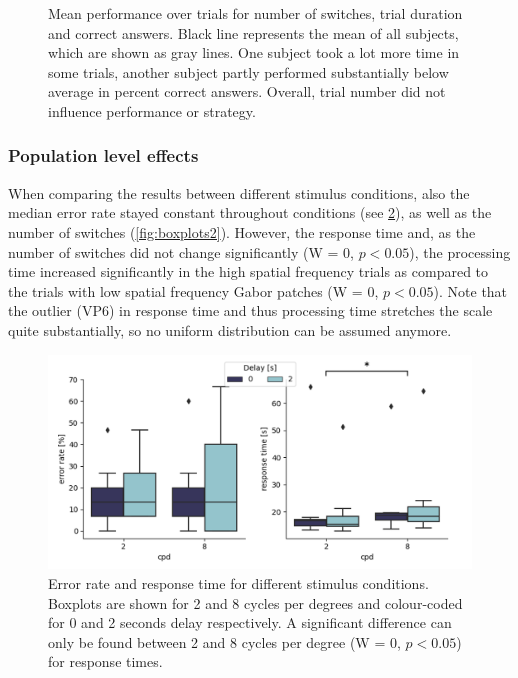 \begin{figure}[H]
    \centering
    
    \caption[Mean performance over trials]{Mean performance over trials for number of switches, trial duration and correct answers. Black line represents the mean of all subjects, which are shown as gray lines. One subject took a lot more time in some trials, another subject partly performed substantially below average in percent correct answers. Overall, trial number did not influence performance or strategy.}
    \label{fig:trial_stability}
\end{figure}

\subsubsection{Population level effects}

When comparing the results between different stimulus conditions, also the median error rate stayed constant throughout conditions (see \ref{fig:boxplots1}), as well as the number of switches (\ref{fig:boxplots2}). However, the response time and, as the number of switches did not change significantly (W = 0, $p<0.05$), the processing time increased significantly in the high spatial frequency trials as compared to the trials with low spatial frequency Gabor patches (W = 0, $p<0.05$). Note that the outlier (VP6) in response time and thus processing time stretches the scale quite substantially, so no uniform distribution can be assumed anymore. 

\begin{figure}[H]
    \centering
    \includegraphics[width=\textwidth]{Figures/box_plots_err+resp_protocol.png}
    \caption[Error rate and response time]{Error rate and response time for different stimulus conditions. Boxplots are shown for 2 and 8 cycles per degrees and colour-coded for 0 and 2 seconds delay respectively. A significant difference can only be found between 2 and 8 cycles per degree (W = 0, $p<0.05$) for response times.}
    \label{fig:boxplots1}
\end{figure}

